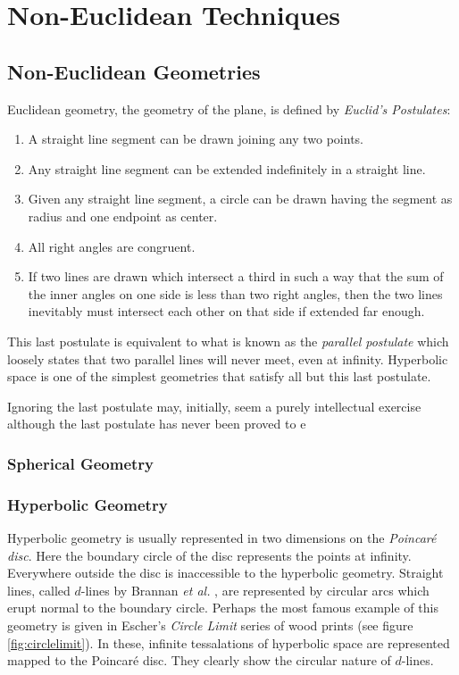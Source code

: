 \chapter{Non-Euclidean Techniques}

\section{Non-Euclidean Geometries}


Euclidean geometry, the geometry of the plane, is defined by \emph{Euclid's Postulates}:

\begin{enumerate}
\item A straight line segment can be drawn joining any two points. 
\item Any straight line segment can be extended indefinitely in a straight line. 
\item Given any straight line segment, a circle can be drawn having the segment as radius and one endpoint as center. 
\item All right angles are congruent. 
\item If two lines are drawn which intersect a third in such a way that the sum of the inner angles on one side is less than two right angles, then the two lines inevitably must intersect each other on that side if extended far enough.
\end{enumerate} 

This last postulate is equivalent to what is known as the \emph{parallel postulate}
which loosely states that two parallel lines will never meet, even at infinity.
Hyperbolic space is one of the simplest geometries that satisfy all but this
last postulate.

Ignoring the last postulate may, initially, seem a purely intellectual exercise
although the last postulate has never been proved to e

\subsection{Spherical Geometry}
\subsection{Hyperbolic Geometry}


Hyperbolic geometry is usually represented in two dimensions on the
\emph{Poincar\'e disc}. Here the boundary circle of the disc represents
the points at infinity. Everywhere outside the disc is inaccessible to
the hyperbolic geometry. Straight lines, called $d$-lines by Brannan
\emph{et al.} \cite{brannan}, are represented by circular arcs which erupt 
normal to the boundary circle. Perhaps the most famous example of this
geometry is given in Escher's \emph{Circle Limit} series of wood
prints (see figure \ref{fig:circlelimit}). In these, infinite tessalations
of hyperbolic space are represented mapped to the Poincar\'e disc. They
clearly show the circular nature of $d$-lines.

